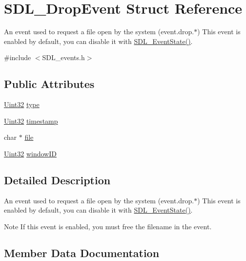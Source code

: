 \hypertarget{struct_s_d_l___drop_event}{}\section{S\+D\+L\+\_\+\+Drop\+Event Struct Reference}
\label{struct_s_d_l___drop_event}


An event used to request a file open by the system (event.\+drop.$\ast$) This event is enabled by default, you can disable it with \hyperlink{_s_d_l__events_8h_afb772893e1c46f186fa39a4defe76df3}{S\+D\+L\+\_\+\+Event\+State()}.  




{\ttfamily \#include $<$S\+D\+L\+\_\+events.\+h$>$}

\subsection*{Public Attributes}
\begin{DoxyCompactItemize}
\item 
\hyperlink{_s_d_l__stdinc_8h_add440eff171ea5f55cb00c4a9ab8672d}{Uint32} \hyperlink{struct_s_d_l___drop_event_a5ea27cfaa5f8d4940e9a69b68b3cc035}{type}
\item 
\hyperlink{_s_d_l__stdinc_8h_add440eff171ea5f55cb00c4a9ab8672d}{Uint32} \hyperlink{struct_s_d_l___drop_event_a02d2c81bb22db632a40cd0021ff751ab}{timestamp}
\item 
char $\ast$ \hyperlink{struct_s_d_l___drop_event_abc41ef4beb62e1d8b56827128b29585f}{file}
\item 
\hyperlink{_s_d_l__stdinc_8h_add440eff171ea5f55cb00c4a9ab8672d}{Uint32} \hyperlink{struct_s_d_l___drop_event_a8cecd2178cdc04118bf852e7cf7bf647}{window\+ID}
\end{DoxyCompactItemize}


\subsection{Detailed Description}
An event used to request a file open by the system (event.\+drop.$\ast$) This event is enabled by default, you can disable it with \hyperlink{_s_d_l__events_8h_afb772893e1c46f186fa39a4defe76df3}{S\+D\+L\+\_\+\+Event\+State()}. 

\begin{DoxyNote}{Note}
If this event is enabled, you must free the filename in the event. 
\end{DoxyNote}


\subsection{Member Data Documentation}
\mbox{\label{struct_s_d_l___drop_event_abc41ef4beb62e1d8b56827128b29585f}} 
